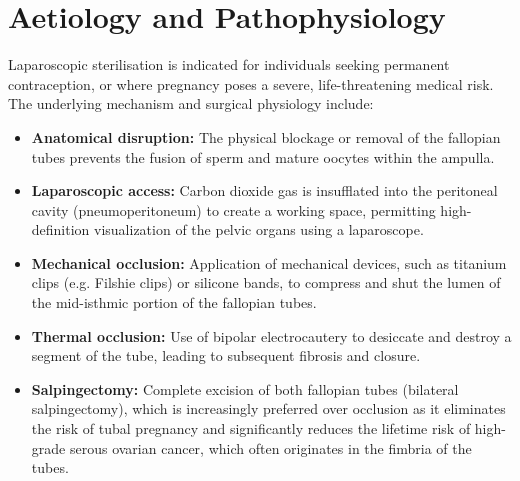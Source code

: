 \section*{Aetiology and Pathophysiology}
Laparoscopic sterilisation is indicated for individuals seeking permanent contraception, or where pregnancy poses a severe, life-threatening medical risk. The underlying mechanism and surgical physiology include:
\begin{itemize}
    \item \textbf{Anatomical disruption:} The physical blockage or removal of the fallopian tubes prevents the fusion of sperm and mature oocytes within the ampulla.
    \item \textbf{Laparoscopic access:} Carbon dioxide gas is insufflated into the peritoneal cavity (pneumoperitoneum) to create a working space, permitting high-definition visualization of the pelvic organs using a laparoscope.
    \item \textbf{Mechanical occlusion:} Application of mechanical devices, such as titanium clips (e.g. Filshie clips) or silicone bands, to compress and shut the lumen of the mid-isthmic portion of the fallopian tubes.
    \item \textbf{Thermal occlusion:} Use of bipolar electrocautery to desiccate and destroy a segment of the tube, leading to subsequent fibrosis and closure.
    \item \textbf{Salpingectomy:} Complete excision of both fallopian tubes (bilateral salpingectomy), which is increasingly preferred over occlusion as it eliminates the risk of tubal pregnancy and significantly reduces the lifetime risk of high-grade serous ovarian cancer, which often originates in the fimbria of the tubes.
\end{itemize}

